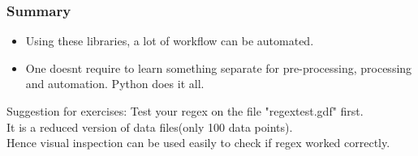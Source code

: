 \documentclass[xcolor=table]{beamer}
\begin{document}
\begin{frame}
\frametitle{Summary}
\begin{itemize}
\item Using these libraries, a lot of workflow can be automated.
\item One doesnt require to learn something separate for pre-processing, processing and automation. Python does it all.
\end{itemize}

Suggestion for exercises:
Test your regex on the file "regextest.gdf" first.\\ It is a reduced version of data files(only 100 data points).\\
Hence visual inspection can be used easily to check if regex worked correctly.
\end{frame} 
\end{document}

